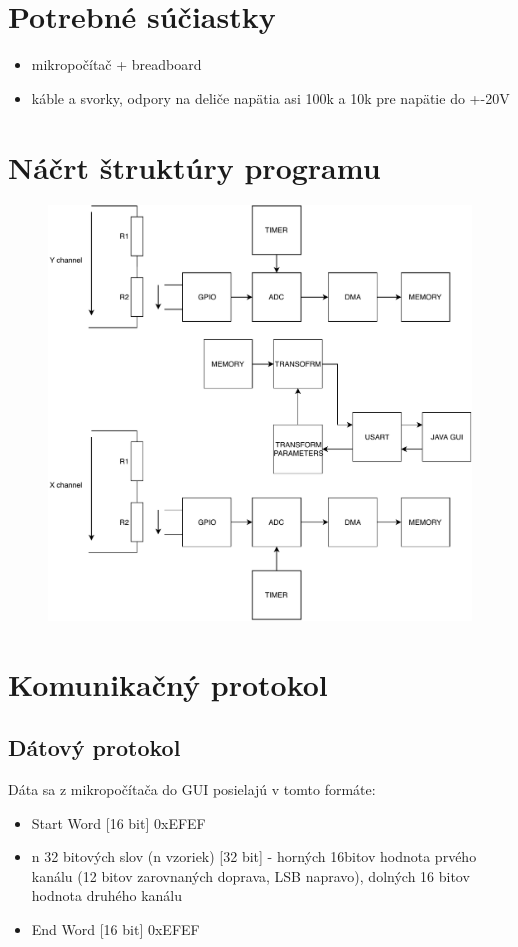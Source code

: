 \documentclass{article}
\begin{document}
	\section{Potrebné súčiastky}
		\begin{itemize}
		\item mikropočítač + breadboard
		\item káble a svorky, odpory na deliče napätia asi 100k a 10k pre napätie do +-20V
	\end{itemize}
	\section{Náčrt štruktúry programu}
	
	\begin{figure}[h!]
		\centering
		\includegraphics[width=\linewidth]{../Obrazky/basicstructure.pdf}
	\end{figure}


	\pagebreak
	\section{Komunikačný protokol}
	\subsection{Dátový protokol}
	Dáta sa z mikropočítača do GUI posielajú v tomto formáte:
		\begin{itemize}
			\item	Start Word [16 bit]	0xEFEF
			\item n 32 bitových slov (n vzoriek) [32 bit] - horných 16bitov hodnota prvého kanálu (12 bitov zarovnaných doprava, LSB napravo), dolných 16 bitov hodnota druhého kanálu
			\item End Word [16 bit] 0xEFEF
		\end{itemize}
		
\end{document}
